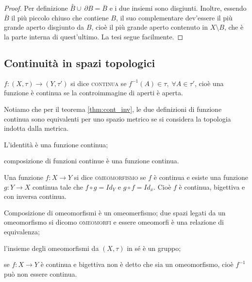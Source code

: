 \documentclass{article}
\begin{document}
\begin{proof}
	Per definizione $\stackrel{\circ}{B} \cup\ \partial B=\overline{B}$ e i due insiemi sono disgiunti. Inoltre, essendo $\overline B$ il più piccolo chiuso che contiene $B$, il suo complementare dev'essere il più grande aperto disgiunto da $B$, cioè il più grande aperto contenuto in $X \setminus B$, che è la parte interna di quest'ultimo. La tesi segue facilmente.
\end{proof}

\subsection{Continuità in spazi topologici}

\begin{defn}
$f: (X, \tau) \rightarrow (Y, \tau')$ si dice \textsc{continua} se ${f^{-1}(A)
\in \tau,}\; {\forall A \in \tau'}$, cioè una funzione \`e continua se la
controimmagine di aperti \`e aperta.
\end{defn}

Notiamo che per il teorema \ref{thm:cont_inv}, le due
definizioni di funzione continua sono equivalenti per uno spazio metrico se si
considera la topologia indotta dalla metrica.

\begin{thm}
\begin{nlist}
\item L'identità è una funzione continua;
\item composizione di funzioni continue è una funzione continua.
\end{nlist}
\end{thm}

\begin{defn}
Una funzione $f: X \rightarrow Y$ si dice \textsc{omeomorfismo} se $f$ è
continua e esiste una funzione $g:Y\rightarrow X$ continua tale che $f \circ g =
Id_Y$ e $g \circ f = Id_x$. Cio\`e $f$ \`e continua, bigettiva e con inversa
continua.
\end{defn}

\begin{oss}
	\begin{nlist}
	\item Composizione di omeomorfismi è un omeomerfismo; due spazi legati da un
	omeomorfismo si dicomo \textsc{omeomorfi} e essere omeomorfi è una relazione
	di equivalenza;
	\item l'insieme degli omeomorfismi da $(X, \tau)$ in sé è un gruppo;
	\item se $f:X \rightarrow Y$ è continua e bigettiva non è detto che sia un
	omeomorfismo, cioè $f^{-1}$ può non essere continua.
    \marginpar{\warningsign}
\end{nlist}
\end{oss}
\end{document}
